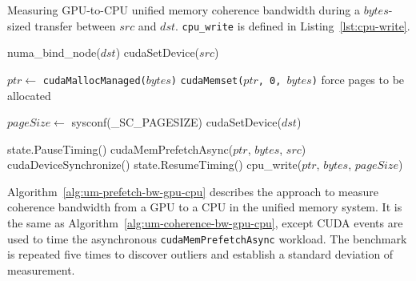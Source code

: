 \begin{algorithm}[H]
	\caption[Measuring GPU-to-CPU unified memory coherence bandwidth.]{
		Measuring GPU-to-CPU unified memory coherence bandwidth during a $bytes$-sized transfer between $src$ and $dst$.
		\texttt{cpu\_write} is defined in Listing~\ref{lst:cpu-write}.
	}
	\label{alg:um-coherence-bw-gpu-cpu}
	\begin{algorithmic}[1]
		\Statex
		
		\State numa\_bind\_node($dst$)
		\State cudaSetDevice($src$)

		\State $ptr \gets$ \texttt{cudaMallocManaged($bytes$)}
		\State \texttt{cudaMemset($ptr$, 0, $bytes$)} \Comment force pages to be allocated

		\State $pageSize \gets$ sysconf(\_SC\_PAGESIZE)
		\State cudaSetDevice($dst$)        
				
			\State state.PauseTiming()
			\State cudaMemPrefetchAsync($ptr$, $bytes$, $src$)
			\State cudaDeviceSynchronize()
			\State state.ResumeTiming()
			\State cpu\_write($ptr$, $bytes$, $pageSize$)
		\EndFor
		\EndFunction			
	\end{algorithmic}
\end{algorithm}

Algorithm~\ref{alg:um-prefetch-bw-gpu-cpu} describes the approach to measure coherence bandwidth from a GPU to a CPU in the unified memory system.
It is the same as Algorithm~\ref{alg:um-coherence-bw-gpu-cpu}, except CUDA events are used to time the asynchronous \texttt{cudaMemPrefetchAsync} workload.
The benchmark is repeated five times to discover outliers and establish a standard deviation of measurement.

